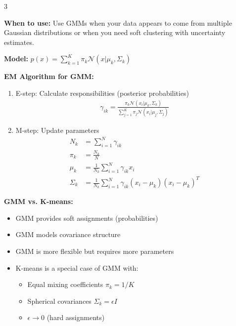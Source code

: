 \documentclass[10pt,landscape]{article}
\begin{document}
\begin{multicols}{3}
\begin{tcolorbox}[breakable, title=6.2 Gaussian Mixture Models (GMM), colback=mixture]
\textbf{When to use:} Use GMMs when your data appears to come from multiple Gaussian distributions or when you need soft clustering with uncertainty estimates.

\textbf{Model:} $p(x) = \sum_{k=1}^K \pi_k \mathcal{N}(x|\mu_k, \Sigma_k)$

\textbf{EM Algorithm for GMM:}
\begin{enumerate}[leftmargin=*,noitemsep,topsep=0pt]
    \item E-step: Calculate responsibilities (posterior probabilities)
    \begin{align}
    \gamma_{ik} = \frac{\pi_k \mathcal{N}(x_i|\mu_k, \Sigma_k)}{\sum_{j=1}^K \pi_j \mathcal{N}(x_i|\mu_j, \Sigma_j)}
    \end{align}
    
    \item M-step: Update parameters
    \begin{align}
    N_k &= \sum_{i=1}^N \gamma_{ik}\\
    \pi_k &= \frac{N_k}{N}\\
    \mu_k &= \frac{1}{N_k}\sum_{i=1}^N \gamma_{ik}x_i\\
    \Sigma_k &= \frac{1}{N_k}\sum_{i=1}^N \gamma_{ik}(x_i - \mu_k)(x_i - \mu_k)^T
    \end{align}
\end{enumerate}

\textbf{GMM vs. K-means:}
\begin{itemize}[leftmargin=*,noitemsep,topsep=0pt]
    \item GMM provides soft assignments (probabilities)
    \item GMM models covariance structure
    \item GMM is more flexible but requires more parameters
    \item K-means is a special case of GMM with:
    \begin{itemize}[leftmargin=*,noitemsep]
        \item Equal mixing coefficients $\pi_k = 1/K$
        \item Spherical covariances $\Sigma_k = \epsilon I$
        \item $\epsilon \to 0$ (hard assignments)
    \end{itemize}
\end{itemize}


\end{tcolorbox}
\end{multicols}
\end{document}
